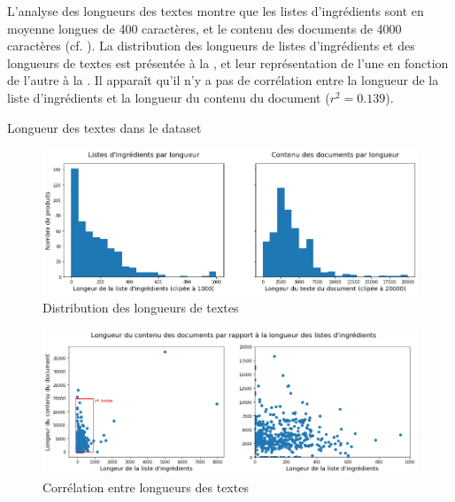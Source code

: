         L'analyse des longueurs des textes montre que les listes d'ingrédients sont en moyenne longues de 400 caractères, et le contenu des documents de 4000 caractères (cf. ).
        La distribution des longueurs de listes d'ingrédients et des longueurs de textes est présentée à la , et leur représentation de l'une en fonction de l'autre à la .
        Il apparaît qu'il n'y a pas de corrélation entre la longueur de la liste d'ingrédients et la longueur du contenu du document ($r^{2} = 0.139$).
        \begin{table}[htbp]
            \begin{center}
            {\scriptsize
            
            }
            \caption{Longueur des textes dans le dataset}
            \label{tbl:text_lengths}
            \end{center}
        \end{table}       
        \begin{figure}[htbp]
            \begin{center}
            \includegraphics[width=0.9\linewidth]{img/text_lengths.png}
            \end{center}
            \caption{Distribution des longueurs de textes}
            \label{fig:text_length}
        \end{figure}     
        \begin{figure}[htbp]
            \begin{center}
            \includegraphics[width=0.9\linewidth]{img/text_lengths_2.png}
            \end{center}
            \caption{Corrélation entre longueurs des textes}
            \label{fig:text_length_2}
        \end{figure}     

